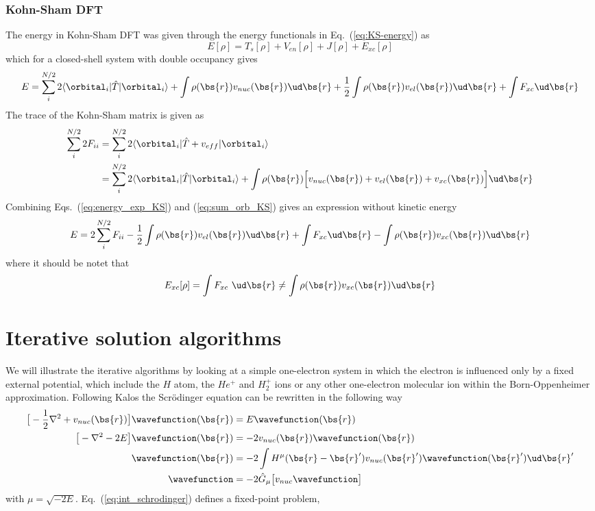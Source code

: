 \subsubsection{Kohn-Sham DFT}
The energy in Kohn-Sham DFT was given through the energy functionals in Eq.~(\ref{eq:KS-energy}) as
\begin{equation}
    E[\rho] = T_s[\rho] + V_{en}[\rho] + J[\rho] + E_{xc}[\rho]
\end{equation}
which for a closed-shell system with double occupancy gives
\begin{equation}
    \label{eq:energy_exp_KS}
    E = \sum_i^{N/2} 2\langle \orbital_i|\hat{T}|\orbital_i \rangle
	+ \int \rho(\bs{r})v_{nuc}(\bs{r}) \ud\bs{r}
	+ \frac{1}{2} \int \rho(\bs{r})v_{el}(\bs{r}) \ud\bs{r}
	+ \int F_{xc} \ud\bs{r}
\end{equation}
The trace of the Kohn-Sham matrix is given as
\begin{align}
    \sum_i^{N/2} 2F_{ii} &= \sum_i^{N/2} 2\langle\orbital_i|\hat{T} + v_{eff}|\orbital_i\rangle\\
    \label{eq:sum_orb_KS}
		    &= \sum_i^{N/2} 2\langle\orbital_i|\hat{T}|\orbital_i\rangle
		     + \int \rho(\bs{r})\Big[v_{nuc}(\bs{r}) + v_{el}(\bs{r}) + v_{xc}(\bs{r})\Big] \ud\bs{r}
\end{align}
Combining Eqs.~(\ref{eq:energy_exp_KS}) and (\ref{eq:sum_orb_KS}) gives an expression without
kinetic energy
\begin{equation}
    E = 2 \sum_i^{N/2} F_{ii} - \frac{1}{2} \int \rho(\bs{r})v_{el}(\bs{r}) \ud\bs{r}
	+ \int F_{xc} \ud\bs{r} - \int \rho(\bs{r})v_{xc}(\bs{r}) \ud\bs{r}
\end{equation}
where it should be notet that 
\begin{equation}
    E_{xc}[\rho] = \int F_{xc} \ud\bs{r} \neq \int \rho(\bs{r})v_{xc}(\bs{r}) \ud\bs{r}
\end{equation}

\section{Iterative solution algorithms}
We will illustrate the iterative algorithms by looking at a simple one-electron system in which the 
electron is influenced only by a fixed external potential, which include the $H$ atom, the $He^+$ and 
$H_2^+$ ions or any other one-electron molecular ion within the Born-Oppenheimer approximation. 
Following Kalos\cite{kalos} the Scr\"{o}dinger equation can be rewritten in the following way
\begin{align}
    \big[-\frac{1}{2}\nabla^2+v_{nuc}(\bs{r})\big]\wavefunction(\bs{r}) &= E \wavefunction(\bs{r})\\
    \big[-\nabla^2 - 2E\big]\wavefunction(\bs{r}) &= -2v_{nuc}(\bs{r}) \wavefunction(\bs{r})\\
    \wavefunction(\bs{r}) &= -2\int H^{\mu}(\bs{r}-\bs{r}')v_{nuc}(\bs{r}') 
	\wavefunction(\bs{r}') \ud \bs{r}'\\
    \label{eq:int_schrodinger}
    \wavefunction &= -2 \hat{G}_{\mu}\big[v_{nuc}\wavefunction\big]
\end{align}
with $\mu = \sqrt{-2E}$. Eq.~(\ref{eq:int_schrodinger}) defines a fixed-point problem,

